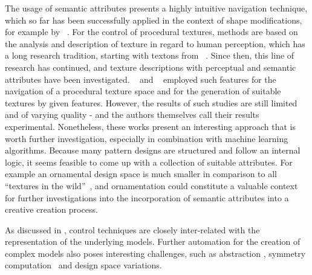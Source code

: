 The usage of semantic attributes presents a highly intuitive navigation technique, which so far has been successfully applied in the context of shape modifications, for example by \citeauthor*{yumer_2015_sse}~\cite{yumer_2015_sse}. For the control of procedural textures, methods are based on the analysis and description of texture in regard to human perception, which has a long research tradition, starting with textons from \citeauthor*{julesz_1981_tte}~\cite{julesz_1981_tte}. 
Since then, this line of research has continued, and texture descriptions with perceptual \cite{liu_2015_vpp} and semantic~\cite{matthews_2013_eta,cimpoi_2014_dtw} attributes have been investigated. \citeauthor*{dong_2017_ptg}~\cite{dong_2017_ptg} and \citeauthor*{liu_2018_ppt}~\cite{liu_2018_ppt} employed such features for the navigation of a procedural texture space and for the generation of suitable textures by given features. However, the results of such studies are still limited and of varying quality - and the authors themselves \cite{liu_2018_ppt} call their results experimental. Nonetheless, these works present an interesting approach that is worth further investigation, especially in combination with machine learning algorithms. Because many pattern designs are structured and follow an internal logic, it seems feasible to come up with a collection of suitable attributes. For example an ornamental design space is much smaller in comparison to all ``textures in the wild''~\cite{cimpoi_2014_dtw}, and ornamentation could constitute a valuable context for further investigations into the incorporation of semantic attributes into a creative creation process.

As discussed in , control techniques are closely inter-related with the representation of the underlying models. 
Further automation for the creation of complex models also poses interesting challenges, such as abstraction \cite{nan_2011_cgr}, symmetry computation~\cite{cullen_2011_sh} and design space variations.